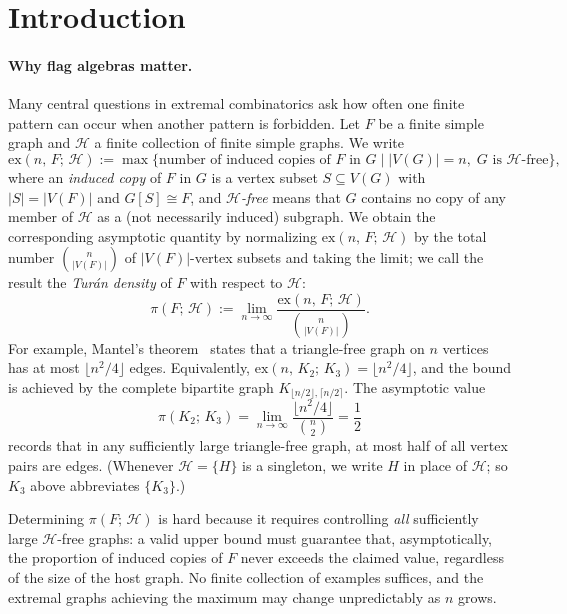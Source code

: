 \documentclass{article}
\newcommand{\tdensity}[2]{\pi(#1;\,#2)}
\begin{document}
\section{Introduction}
\label{sec:intro}

\paragraph{Why flag algebras matter.}
Many central questions in extremal combinatorics ask how often one finite
pattern can occur when another pattern is forbidden.  Let $F$ be a finite
simple graph and $\mathcal{H}$ a finite collection of finite simple graphs.  We write
\[
  \mathrm{ex}(n,\,F;\,\mathcal{H})
  :=
  \max\bigl\{
    \text{number of induced copies of }F\text{ in }G
    \mid |V(G)|=n,\; G\text{ is }\mathcal{H}\text{-free}
  \bigr\},
\]
where an \emph{induced copy} of $F$ in $G$ is a vertex subset
$S\subseteq V(G)$ with $|S|=|V(F)|$ and $G[S]\cong F$, and
\emph{\(\mathcal{H}\)-free} means that $G$ contains no copy of any
member of $\mathcal{H}$ as a (not necessarily induced) subgraph.  We obtain the
corresponding asymptotic quantity by normalizing
$\mathrm{ex}(n,\,F;\,\mathcal{H})$ by the total number
$\binom{n}{|V(F)|}$ of $|V(F)|$-vertex subsets and taking the limit; we call the
result the \emph{Tur\'an density} of $F$ with respect to $\mathcal{H}$:
\[
  \tdensity{F}{\mathcal{H}}
  :=
  \lim_{n\to\infty}
  \frac{\mathrm{ex}(n,\,F;\,\mathcal{H})}{\binom{n}{|V(F)|}}.
\]
For example, Mantel's theorem~\cite{mantel} states that a triangle-free graph on $n$
vertices has at most $\lfloor n^2/4\rfloor$ edges.  Equivalently,
$\mathrm{ex}(n,\,K_2;\,K_3)=\lfloor n^2/4\rfloor$, and the bound is achieved by the
complete bipartite graph $K_{\lfloor n/2\rfloor,\lceil n/2\rceil}$.  The
asymptotic value
\[
  \tdensity{K_2}{K_3}
  = \lim_{n\to\infty}\frac{\lfloor n^2/4\rfloor}{\binom{n}{2}}
  = \frac{1}{2}
\]
records that in any sufficiently large triangle-free graph, at most half of
all vertex pairs are edges.  (Whenever $\mathcal{H}=\{H\}$ is a singleton, we
write $H$ in place of $\mathcal{H}$; so $K_3$ above abbreviates $\{K_3\}$.)

Determining $\tdensity{F}{\mathcal{H}}$ is hard because it requires controlling
\emph{all} sufficiently large \(\mathcal{H}\)-free graphs: a valid upper
bound must guarantee that, asymptotically, the proportion of induced copies of
$F$ never exceeds the claimed value, regardless of the size of the host graph.  No
finite collection of examples suffices, and the extremal graphs achieving the
maximum may change unpredictably as $n$ grows.
\end{document}
